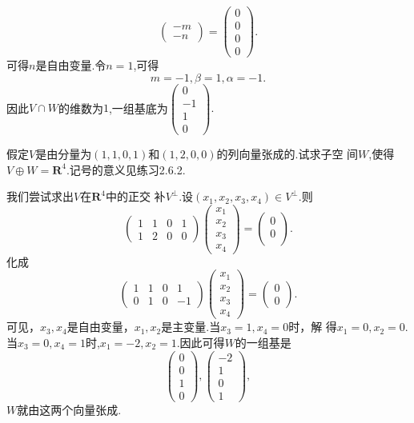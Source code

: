 ﻿\documentclass{book} \usepackage{exsheets} \usepackage{xeCJK}
\begin{document}
\begin{solution}
$$\begin{pmatrix}
  -m\\
  -n
\end{pmatrix}=
\begin{pmatrix}
  0\\
  0\\
  0\\
  0
\end{pmatrix}.
$$
可得$n$是自由变量.令$n=1$,可得
$$
m=-1,\beta=1,\alpha=-1.
$$
因此$V\cap W$的维数为$1$,一组基底为$
\begin{pmatrix}
  0\\
  -1\\
  1\\
  0
\end{pmatrix}.  $
\end{solution}
\begin{question}
  假定$V$是由分量为$(1,1,0,1)$和$(1,2,0,0)$的列向量张成的.试求子空
  间$W$,使得$V\oplus W=\mathbf{R}^4$.记号的意义见练习2.6.2.
\end{question}
\begin{solution}
  我们尝试求出$V$在$\mathbf{R}^4$中的正交
  补$V^{\perp}$.设$(x_1,x_2,x_3,x_4)\in V^{\perp}$.则
$$
\begin{pmatrix}
  1&1&0&1\\
  1&2&0&0
\end{pmatrix}
\begin{pmatrix}
  x_1\\
  x_2\\
  x_3\\
  x_4
\end{pmatrix}=
\begin{pmatrix}
  0\\
  0\\
\end{pmatrix}.
$$
化成
$$
\begin{pmatrix}
  1&1&0&1\\
  0&1&0&-1
\end{pmatrix}
\begin{pmatrix}
  x_1\\
  x_2\\
  x_3\\
  x_4
\end{pmatrix}=
\begin{pmatrix}
  0\\
  0
\end{pmatrix}.
$$
可见，$x_3,x_4$是自由变量，$x_1,x_2$是主变量.当$x_3=1,x_4=0$时，解
得$x_1=0,x_2=0$.当$x_3=0,x_4=1$时,$x_1=-2,x_2=1$.因此可得$W$的一组基是
$$
\begin{pmatrix}
  0\\
  0\\
  1\\
  0
\end{pmatrix},
\begin{pmatrix}
  -2\\
  1\\
  0\\
  1
\end{pmatrix},
$$
$W$就由这两个向量张成.
\end{solution}
\end{document}
